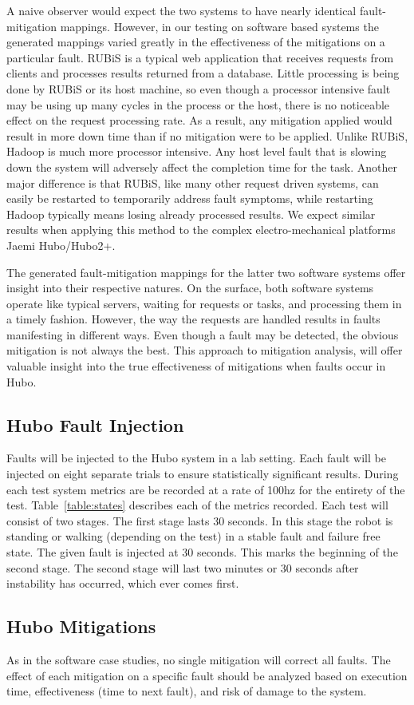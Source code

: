 A naive observer would expect the two systems to have nearly identical fault-mitigation mappings. However, in our testing on software based systems the generated mappings varied greatly in the effectiveness of the mitigations on a particular fault.  RUBiS is a typical web application that receives requests from clients and processes results returned from a database. Little processing is being done by RUBiS or its host machine, so even though a processor intensive fault may be using up many cycles in the process or the host, there is no noticeable effect on the request processing rate. As a result, any mitigation applied would result in more down time than if no mitigation were to be applied. Unlike RUBiS, Hadoop is much more processor intensive. Any host level fault that is slowing down the system will adversely affect the completion time for the task. Another major difference is that RUBiS, like many other request driven systems, can easily be restarted to temporarily address fault symptoms, while restarting Hadoop typically means losing already processed results.  We expect similar results when applying this method to the complex electro-mechanical platforms Jaemi Hubo/Hubo2+.

The generated fault-mitigation mappings for the latter two software systems offer insight into their respective natures. On the surface, both software systems operate like typical servers, waiting for requests or tasks, and processing them in a timely fashion. However, the way the requests are handled results in faults manifesting in different ways. Even though a fault may be detected, the obvious mitigation is not always the best. This approach to mitigation analysis, will offer valuable insight into the true effectiveness of mitigations when faults occur in Hubo.

\subsection{Hubo Fault Injection}\label{sec:faultInjection}
Faults will be injected to the Hubo system in a lab setting.  Each fault will be injected on eight separate trials to ensure statistically significant results.  During each test system metrics are be recorded at a rate of 100hz for the entirety of the test.  Table~\ref{table:states} describes each of the metrics recorded.  Each test will consist of two stages.  The first stage lasts 30 seconds.  In this stage the robot is standing or walking (depending on the test) in a stable fault and failure free state.  The given fault is injected at 30 seconds.  This marks the beginning of the second stage.  The second stage will last two minutes or 30 seconds after instability has occurred, which ever comes first.

\subsection{Hubo Mitigations}
As in the software case studies, no single mitigation will correct all faults. The effect of each mitigation on a specific fault should be analyzed based on execution time, effectiveness (time to next fault), and risk of damage to the system. 







